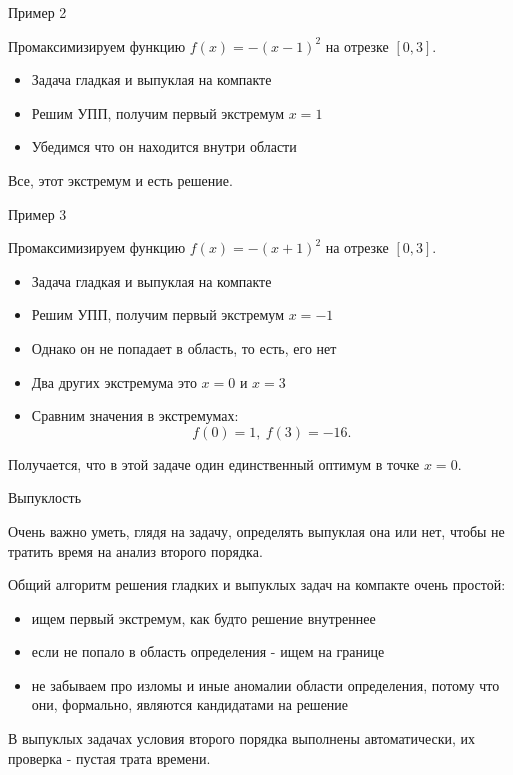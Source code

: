 \documentclass{beamer}
\begin{document}
\begin{frame}{Пример 2}

Промаксимизируем функцию $f(x) = -(x-1)^2$ на отрезке $[0,3]$.

\begin{itemize}
  \item Задача гладкая и выпуклая на компакте
  \item Решим УПП, получим первый экстремум $x = 1$
  \item Убедимся что он находится внутри области
\end{itemize}

Все, этот экстремум и есть решение.

\end{frame}

\begin{frame}{Пример 3}

Промаксимизируем функцию $f(x) = -(x+1)^2$ на отрезке $[0,3]$.

\begin{itemize}
  \item Задача гладкая и выпуклая на компакте
  \item Решим УПП, получим первый экстремум $x = -1$
  \item Однако он не попадает в область, то есть, его нет
  \item Два других экстремума это $x = 0$ и $x = 3$
  \item Сравним значения в экстремумах: $$f(0) = 1, \ f(3) = -16.$$
\end{itemize}

Получается, что в этой задаче один единственный оптимум в точке $x = 0$.

\end{frame}

\begin{frame}{Выпуклость}

Очень важно уметь, глядя на задачу, определять выпуклая она или нет, чтобы не тратить время на анализ второго порядка. 

Общий алгоритм решения гладких и выпуклых задач на компакте очень простой:

\begin{itemize}
\item ищем первый экстремум, как будто решение внутреннее
\item если не попало в область определения - ищем на границе
\item не забываем про изломы и иные аномалии области определения, потому что они, формально, являются кандидатами на решение
\end{itemize}

\alert{В выпуклых задачах условия второго порядка выполнены автоматически}, их проверка - пустая трата времени.

\end{frame}
\end{document}
